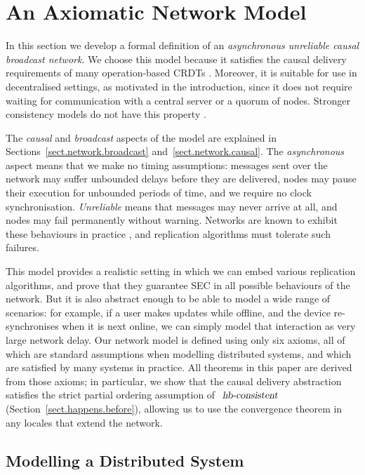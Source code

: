\section{An Axiomatic Network Model}
\label{sect.network}

In this section we develop a formal definition of an \emph{asynchronous unreliable causal broadcast network}.
We choose this model because it satisfies the causal delivery requirements of many operation-based CRDTs \cite{Almeida:2015fc,Baquero:2014ed}.
Moreover, it is suitable for use in decentralised settings, as motivated in the introduction, since it does not require waiting for communication with a central server or a quorum of nodes.
Stronger consistency models do not have this property \cite{Attiya:2015dm,Davidson:1985hv}.

The \emph{causal} and \emph{broadcast} aspects of the model are explained in Sections~\ref{sect.network.broadcast} and~\ref{sect.network.causal}.
The \emph{asynchronous} aspect means that we make no timing assumptions: messages sent over the network may suffer unbounded delays before they are delivered, nodes may pause their execution for unbounded periods of time, and we require no clock synchronisation.
\emph{Unreliable} means that messages may never arrive at all, and nodes may fail permanently without warning.
Networks are known to exhibit these behaviours in practice \cite{Bailis:2014jx}, and replication algorithms must tolerate such failures.

This model provides a realistic setting in which we can embed various replication algorithms, and prove that they guarantee SEC in all possible behaviours of the network.
But it is also abstract enough to be able to model a wide range of scenarios: for example, if a user makes updates while offline, and the device re-synchronises when it is next online, we can simply model that interaction as very large network delay.
Our network model is defined using only six axioms, all of which are standard assumptions when modelling distributed systems, and which are satisfied by many systems in practice.
All theorems in this paper are derived from those axioms; in particular, we show that the causal delivery abstraction satisfies the strict partial ordering assumption of $\isa{hb-consistent}$ (Section~\ref{sect.happens.before}), allowing us to use the convergence theorem in any locales that extend the network.

\subsection{Modelling a Distributed System}

